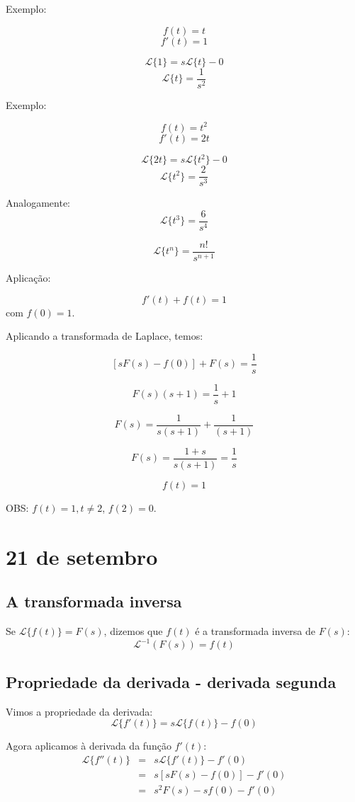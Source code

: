 \documentclass[a4paper,10pt]{book}
\begin{document}
 Exemplo:
 
 $$f(t)=t$$
 $$f'(t)=1$$
 
 $$\mathcal{L}\{1\}=s\mathcal{L}\{ t\}-0$$
 $$\mathcal{L}\{ t\} = \frac{1}{s^2}$$


  Exemplo:
 
 $$f(t)=t^2$$
 $$f'(t)=2t$$
 
 $$\mathcal{L}\{2t\}=s\mathcal{L}\{ t^2\}-0$$
 $$\mathcal{L}\{ t^2\} = \frac{2}{s^3}$$

 
 Analogamente:
 $$\mathcal{L}\{ t^3\} = \frac{6}{s^4}$$

  $$\mathcal{L}\{ t^n\} = \frac{n!}{s^{n+1}}$$
  
  
  
  Aplicação:
  
  $$f'(t)+f(t) = 1$$
  com $f(0)=1$.

  Aplicando a transformada de Laplace, temos:
  
  $$\left[sF(s)-f(0)\right]+F(s)=\frac{1}{s}$$
  
  $$F(s)(s+1) = \frac{1}{s}+1$$
  
  $$F(s) = \frac{1}{s(s+1)}+\frac{1}{(s+1)}$$
  
  $$F(s) = \frac{1+s}{s(s+1)}=\frac{1}{s}$$
  
  $$f(t)=1$$
  
  OBS: $f(t)=1, t\neq 2$,  $f(2)=0$.
  
  
  \chapter{21 de setembro}

  \section{A transformada inversa}
  
  Se $\mathcal{L}\{f(t)\}=F(s)$, dizemos que $f(t)$ é a transformada inversa de $F(s)$:
  $$\mathcal{L}^ {-1}(F(s))=f(t)$$
  
  \section{Propriedade da derivada - derivada segunda}
 Vimos a propriedade da derivada:
    $$\mathcal{L}\{f'(t)\}=s\mathcal{L}\{ f(t)\}-f(0)$$
 
 Agora aplicamos à derivada da função $f'(t)$:
 \begin{eqnarray*}
 \mathcal{L}\{f''(t)\}&=&s\mathcal{L}\{ f'(t)\}-f'(0)\\
 &=&s\left[sF(s)-f(0)\right]-f'(0)\\
 &=&s^2F(s)-sf(0)-f'(0)\\
 \end{eqnarray*}
\end{document}
